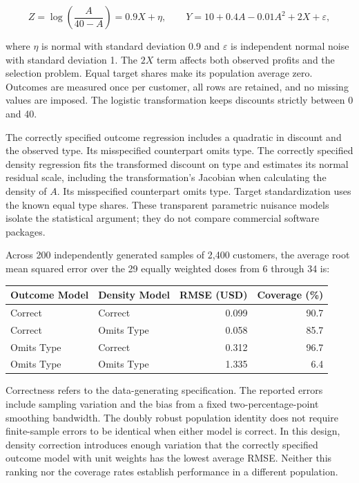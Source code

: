 \[
Z=\log\!\left(\frac{A}{40-A}\right)=0.9X+\eta,
\qquad Y=10+0.4A-0.01A^2+2X+\varepsilon,
\]

where \(\eta\) is normal with standard deviation 0.9 and \(\varepsilon\)
is independent normal noise with standard deviation 1. The \(2X\) term
affects both observed profits and the selection problem. Equal target
shares make its population average zero. Outcomes are measured once per
customer, all rows are retained, and no missing values are imposed. The
logistic transformation keeps discounts strictly between 0 and 40.

The correctly specified outcome regression includes a quadratic in
discount and the observed type. Its misspecified counterpart omits type.
The correctly specified density regression fits the transformed discount
on type and estimates its normal residual scale, including the
transformation's Jacobian when calculating the density of \(A\). Its
misspecified counterpart omits type. Target standardization uses the
known equal type shares. These transparent parametric nuisance models
isolate the statistical argument; they do not compare commercial
software packages.

Across 200 independently generated samples of 2,400 customers, the
average root mean squared error over the 29 equally weighted doses from
6 through 34 is:

\begin{table}[H]
\centering\small
\begin{tabular}{@{}llrr@{}}
\toprule
Outcome Model & Density Model & RMSE (USD) & Coverage (\%) \\
\midrule

Correct & Correct & 0.099 & 90.7 \\
Correct & Omits Type & 0.058 & 85.7 \\
Omits Type & Correct & 0.312 & 96.7 \\
Omits Type & Omits Type & 1.335 & 6.4 \\
\bottomrule
\end{tabular}
\end{table}

Correctness refers to the data-generating specification. The reported
errors include sampling variation and the bias from a fixed
two-percentage-point smoothing bandwidth. The doubly robust population
identity does not require finite-sample errors to be identical when
either model is correct. In this design, density correction introduces
enough variation that the correctly specified outcome model with unit
weights has the lowest average RMSE. Neither this ranking nor the
coverage rates establish performance in a different population.

